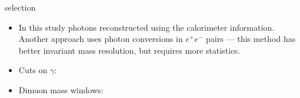 \begin{frame}{\chib selection}
\begin{itemize}
\item In this study photons reconstructed using the calorimeter information. 
Another approach uses photon conversions in $e^{+}e^{-}$ pairs  --- this method
has better invariant mass resolution, but requires more statistics.

\item Cuts on $\gamma$:
\begin{center}
\end{center}

\bigskip

\item Dimuon mass windows:
\begin{center}
\end{center}

\end{itemize}
\end{frame}
